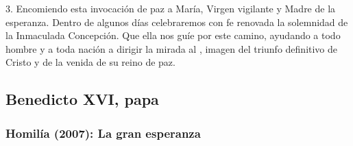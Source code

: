 \begin{body}
	3. Encomiendo esta invocación de paz a María, Virgen vigilante y Madre de la esperanza. Dentro de algunos días celebraremos con fe renovada la solemnidad de la Inmaculada Concepción. Que ella nos guíe por este camino, ayudando a todo hombre y a toda nación a dirigir la mirada al , imagen del triunfo definitivo de Cristo y de la venida de su reino de paz.
\end{body}

\newsection

\subsection{Benedicto XVI, papa}

\subsubsection{Homilía (2007): La gran esperanza}


